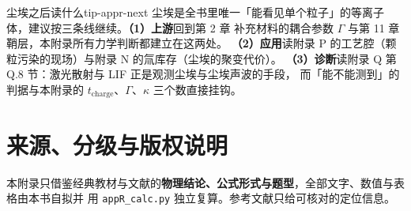 \begin{tip}{尘埃之后读什么}{tip-appr-next}
尘埃是全书里唯一「能看见单个粒子」的等离子体，建议按三条线继续。\textbf{（1）上游}回到第 2 章
补充材料的耦合参数 $\Gamma$ 与第 11 章鞘层，本附录所有力学判断都建立在这两处。
\textbf{（2）应用}读附录 P 的工艺腔（颗粒污染的现场）与附录 N 的氚库存（尘埃的聚变代价）。
\textbf{（3）诊断}读附录 Q 第 Q.8 节：激光散射与 LIF 正是观测尘埃与尘埃声波的手段，
而「能不能测到」的判据与本附录的 $t_{\mathrm{charge}}$、$\Gamma$、$\kappa$ 三个数直接挂钩。
\end{tip}

\section{来源、分级与版权说明}
\label{sec:app-r-source}

\begingroup\small
本附录只借鉴经典教材与文献的\textbf{物理结论、公式形式与题型}，全部文字、数值与表格由本书自拟并
用 \texttt{appR\_calc.py} 独立复算。参考文献只给可核对的定位信息。

